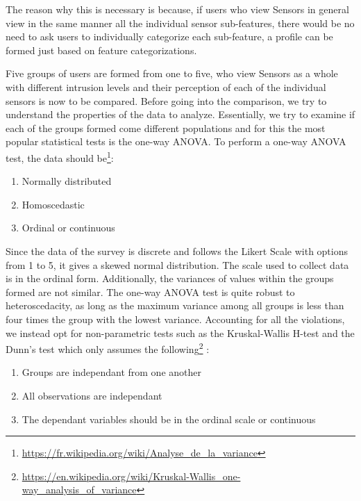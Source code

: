The reason why this is necessary is because, if users who view Sensors in general view in the same manner all the individual sensor sub-features, there would be no need to ask users to individually categorize each sub-feature, a profile can be formed just based on feature categorizations.

Five groups of users are formed from one to five, who view Sensors as a whole with different intrusion levels and their perception of each of the individual sensors is now to be compared. Before going into the comparison, we try to understand the properties of the data to analyze. Essentially, we try to examine if each of the groups formed come different populations and for this the most popular statistical tests is the one-way ANOVA. To perform a one-way ANOVA test, the data should be\footnote{\url{https://fr.wikipedia.org/wiki/Analyse\_de\_la\_variance}}:

\begin{enumerate}
\item Normally distributed
\item Homoscedastic
\item Ordinal or continuous
\end{enumerate}

Since the data of the survey is discrete and follows the Likert Scale with options from 1 to 5, it gives a skewed normal distribution. The scale used to collect data is in the ordinal form. Additionally, the variances of values within the groups formed are not similar. The one-way ANOVA test is quite robust to heteroscedacity, as long as the maximum variance among all groups is less than four times the group with the lowest variance.  Accounting for all the violations, we instead opt for non-parametric tests such as the Kruskal-Wallis H-test and the Dunn's test
which only assumes the following\footnote{\url{https://en.wikipedia.org/wiki/Kruskal-Wallis\_one-way\_analysis\_of\_variance}} : 

\begin{enumerate}
\item Groups are independant from one another
\item All observations are independant
\item The dependant variables should be in the ordinal scale or continuous
\end{enumerate}

